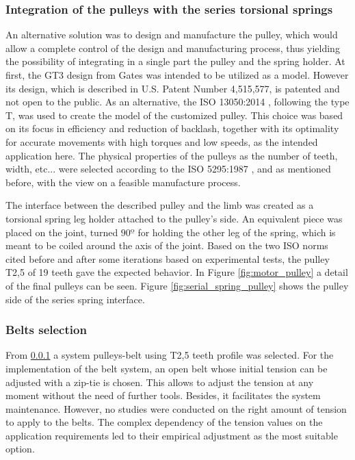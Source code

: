 \subsubsection{Integration of the pulleys with the series torsional springs} %
\label{ssub:integration_with_the_series_rotational}
An alternative solution was to design and manufacture the pulley, which would allow a complete control of the design and manufacturing process, thus yielding the possibility of integrating in a single part the pulley and the spring holder.
At first, the GT3 design from Gates was intended to be utilized as a model.
However its design, which is described in U.S. Patent Number 4,515,577, is patented and not open to the public.
As an alternative, the ISO 13050:2014 \cite{ISO13050}, following the type T, was used to create the model of the customized pulley.
This choice was based on its focus in efficiency and reduction of backlash, together with its optimality for accurate movements with high torques and low speeds, as the intended application here.
The physical properties of the pulleys as the number of teeth, width, etc... were selected according to the ISO 5295:1987 \cite{ISO5295}, and as mentioned before, with the view on a feasible manufacture process.

The interface between the described pulley and the limb was created as a torsional spring leg holder attached to the pulley's side.
An equivalent piece was placed on the joint, turned $90º$ for holding the other leg of the spring, which is meant to be coiled around the axis of the joint.
Based on the two ISO norms cited before and after some iterations based on experimental tests, the pulley T2,5 of 19 teeth gave the expected behavior.
In Figure \ref{fig:motor_pulley} a detail of the final pulleys can be seen.
Figure \ref{fig:serial_spring_pulley} shows the pulley side of the series spring interface.

\subsubsection{Belts selection} %
\label{ssub:belts}
From \ref{ssub:integration_with_the_series_rotational} a system pulleys-belt using T2,5 teeth profile was selected.
For the implementation of the belt system, an open belt whose initial tension can be adjusted with a zip-tie is chosen.
This allows to adjust the tension at any moment without the need of further tools.
Besides, it facilitates the system maintenance.
However, no studies were conducted on the right amount of tension to apply to the belts. 
The complex dependency of the tension values on the application requirements led to their empirical adjustment as the most suitable option.

